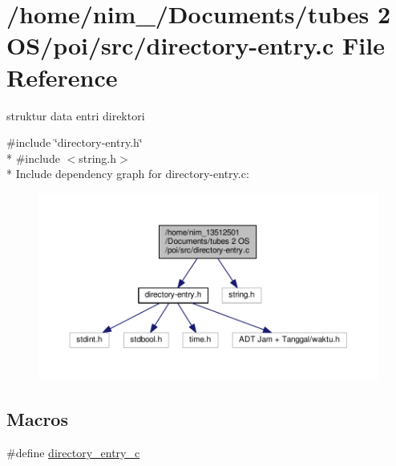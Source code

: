 \hypertarget{directory-entry_8c}{\section{/home/nim\-\_/\-Documents/tubes 2 O\-S/poi/src/directory-\/entry.c File Reference}
\label{directory-entry_8c}
}


struktur data entri direktori  


{\ttfamily \#include \char`\"{}directory-\/entry.\-h\char`\"{}}\\*
{\ttfamily \#include $<$string.\-h$>$}\\*
Include dependency graph for directory-\/entry.c\-:\nopagebreak
\begin{figure}[H]
\begin{center}
\leavevmode
\includegraphics[width=350pt]{directory-entry_8c__incl}
\end{center}
\end{figure}
\subsection*{Macros}
\begin{DoxyCompactItemize}
\item 
\#define \hyperlink{directory-entry_8c_a4cfbd0d55293ca255d9a15bad4e9e0fd}{directory\-\_\-entry\-\_\-c}
\end{DoxyCompactItemize}
